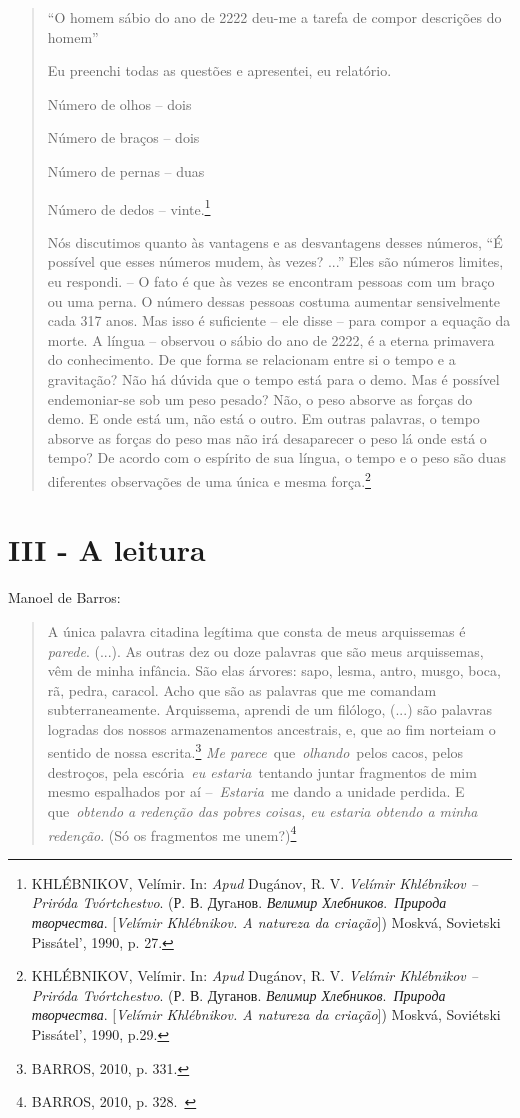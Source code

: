 \begin{quote}
``O homem sábio do ano de 2222 deu-me a tarefa de compor descrições do
homem''

Eu preenchi todas as questões e apresentei, eu relatório.

Número de olhos -- dois

Número de braços -- dois

Número de pernas -- duas

Número de dedos -- vinte.\footnote{KHLÉBNIKOV, Velímir. In: \emph{Apud}
  Dugánov, R. V. \emph{Velímir Khlébnikov -- Priróda Tvórtchestvo}. (Р.
  В. Дугaнов. \emph{Велимир Хлебников}.~\emph{Природа творчества}.
  {[}\emph{Velímir Khlébnikov. A natureza da criação}{]}) Moskvá,
  Sovietski Pissátel', 1990, p. 27.}

Nós discutimos quanto às vantagens e as desvantagens desses números, ``É
possível que esses números mudem, às vezes? ...'' Eles são números
limites, eu respondi. -- O fato é que às vezes se encontram pessoas com
um braço ou uma perna. O número dessas pessoas costuma aumentar
sensivelmente cada 317 anos. Mas isso é suficiente -- ele disse -- para
compor a equação da morte. A língua -- observou o sábio do ano de 2222,
é a eterna primavera do conhecimento. De que forma se relacionam entre
si o tempo e a gravitação? Não há dúvida que o tempo está para o demo.
Mas é possível endemoniar-se sob um peso pesado? Não, o peso absorve as
forças do demo. E onde está um, não está o outro. Em outras palavras, o
tempo absorve as forças do peso mas não irá desaparecer o peso lá onde
está o tempo? De acordo com o espírito de sua língua, o tempo e o peso
são duas diferentes observações de uma única e mesma força.\footnote{KHLÉBNIKOV,
  Velímir. In: \emph{Apud} Dugánov, R. V. \emph{Velímir Khlébnikov --
  Priróda Tvórtchestvo}. (Р. В. Дуганов. \emph{Велимир
  Хлебников}.~\emph{Природа творчества}. {[}\emph{Velímir Khlébnikov. A
  natureza da criação}{]}) Moskvá, Soviétski Pissátel', 1990, p.29.}
\end{quote}

\section{III - A leitura}

Manoel de Barros:

\begin{quote}
A única palavra citadina legítima que consta de meus arquissemas é
\emph{parede}. (...). As outras dez ou doze palavras que são meus
arquissemas, vêm de minha infância. São elas árvores: sapo, lesma,
antro, musgo, boca, rã, pedra, caracol. Acho que são as palavras que me
comandam subterraneamente. Arquissema, aprendi de um filólogo, (...) são
palavras logradas dos nossos armazenamentos ancestrais, e, que ao fim
norteiam o sentido de nossa escrita.\footnote{BARROS, 2010, p. 331.}
\emph{Me parece}~que~\emph{olhando}~pelos cacos, pelos destroços, pela
escória~\emph{eu estaria}~tentando juntar fragmentos de mim mesmo
espalhados por aí --~\emph{Estaria}~me dando a unidade perdida. E
que~\emph{obtendo a redenção das pobres coisas, eu estaria obtendo a
minha redenção}. (Só os fragmentos me unem?)\footnote{BARROS, 2010, p.
  328.~}
\end{quote}


